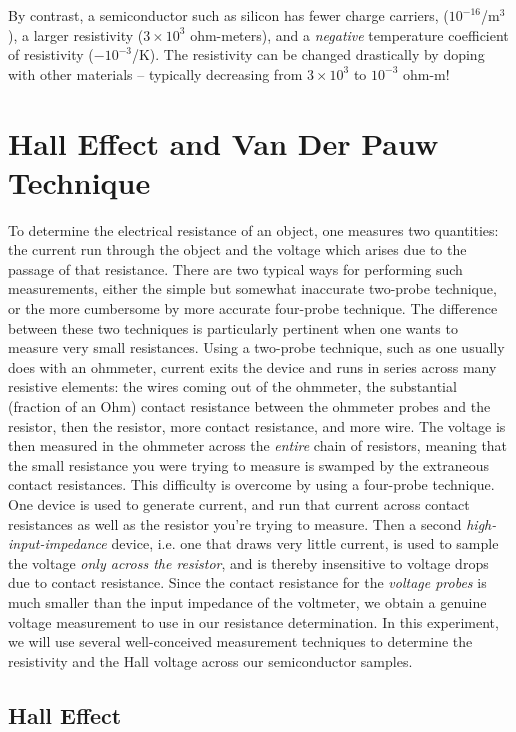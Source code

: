 \documentclass{../lab}
\begin{document}
By contrast, a semiconductor such as silicon has fewer charge carriers, ($10^{-16}$/m$^3$), a larger resistivity ($3 \times 10^3$ ohm-meters), and a \emph{negative} temperature coefficient of resistivity ($-10^{-3}$/K). The resistivity can be changed drastically by doping with other materials – typically decreasing from $3 \times 10^3$ to $10^{-3}$ ohm-m!

\section{Hall Effect and Van Der Pauw Technique}

To determine the electrical resistance of an object, one measures two quantities: the current run through the object and the voltage which arises due to the passage of that resistance. There are two typical ways for performing such measurements, either the simple but somewhat inaccurate two-probe technique, or the more cumbersome by more accurate four-probe technique. The difference between these two techniques is particularly pertinent when one wants to measure very small resistances. Using a two-probe technique, such as one usually does with an ohmmeter, current exits the device and runs in series across many resistive elements: the wires coming out of the ohmmeter, the substantial (fraction of an Ohm) contact resistance between the ohmmeter probes and the resistor, then the resistor, more contact resistance, and more wire. The voltage is then measured in the ohmmeter across the \emph{entire} chain of resistors, meaning that the small resistance you were trying to measure is swamped by the extraneous contact resistances. This difficulty is overcome by using a four-probe technique. One device is used to generate current, and run that current across contact resistances as well as the resistor you're trying to measure. Then a second \emph{high-input-impedance} device, i.e. one that draws very little current, is used to sample the voltage \emph{only across the resistor}, and is thereby insensitive to voltage drops due to contact resistance. Since the contact resistance for the \emph{voltage probes} is much smaller than the input impedance of the voltmeter, we obtain a genuine voltage measurement to use in our resistance determination. In this experiment, we will use several well-conceived measurement techniques to determine the resistivity and the Hall voltage across our semiconductor samples.

\subsection{Hall Effect}
\end{document}
